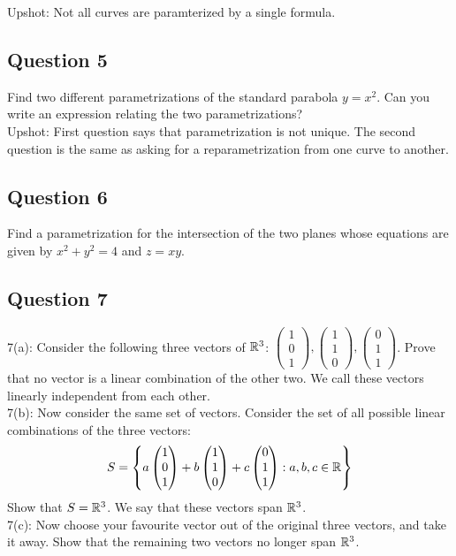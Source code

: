 \documentclass[a4paper]{article}
\begin{document}
Upshot: Not all curves are paramterized by a single formula. 

\subsection*{Question 5}
Find two different parametrizations of the standard parabola $y=x^2$. Can you write an expression relating the two parametrizations?\\

Upshot: First question says that parametrization is not unique. The second question is the same as asking for a reparametrization from one curve to another. 

\subsection*{Question 6}
Find a parametrization for the intersection of the two planes whose equations are given by $x^2+y^2=4$ and $z=xy$. 

\subsection*{Question 7}
7(a): Consider the following three vectors of $\mathbb{R}^3$: $\begin{pmatrix}1 \\ 0 \\ 1\end{pmatrix},\begin{pmatrix}1 \\ 1 \\ 0\end{pmatrix},\begin{pmatrix}0 \\ 1 \\ 1\end{pmatrix}$. Prove that no vector is a linear combination of the other two. We call these vectors linearly independent from each other. \\

7(b): Now consider the same set of vectors. Consider the set of all possible linear combinations of the three vectors: $$S=\left\{a\begin{pmatrix}1 \\ 0 \\ 1\end{pmatrix}+b\begin{pmatrix}1 \\ 1 \\ 0\end{pmatrix}+c\begin{pmatrix}0 \\ 1 \\ 1\end{pmatrix}:a,b,c\in\mathbb{R}\right\}$$ Show that $S=\mathbb{R}^3$. We say that these vectors span $\mathbb{R}^3$. \\

7(c): Now choose your favourite vector out of the original three vectors, and take it away. Show that the remaining two vectors no longer span $\mathbb{R}^3$. 
\end{document}

